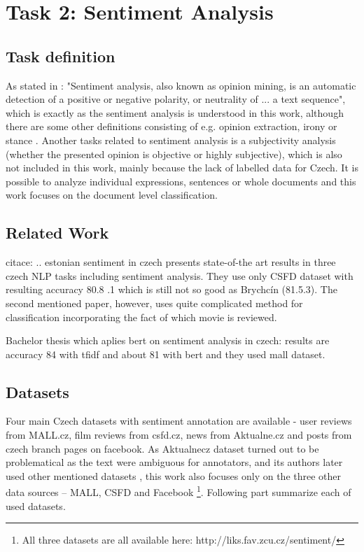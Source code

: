 \chapter{Task 2: Sentiment Analysis}
\label{chap:sent}
\section{Task definition}
As stated in \citep{Veselovska}: "Sentiment analysis, also known as opinion mining, is an automatic detection of a positive or negative polarity, or neutrality of ... a text sequence", which is exactly as the sentiment analysis is understood in this work, although there are some other definitions consisting of e.g. opinion extraction, irony or stance \citep{Montoyo2012}. Another tasks related to sentiment analysis is a subjectivity analysis (whether the presented opinion is objective or highly subjective), which is also not included in this work, mainly because the lack of labelled data for Czech. It is possible to analyze individual expressions, sentences or whole documents \citep{Veselovska} and this work focuses on the document level classification.

\section{Related Work}
citace:
\citep{Cano2019}
\citep{Kittask2020} .. estonian
\citep{Lenc2016} sentiment in czech
\citep{Hercig2018}
\citep{Li}
\citep{Libovicky} presents state-of-the art results in three czech NLP tasks including sentiment analysis. They use only CSFD dataset with resulting accuracy 80.8 .1 which is still not so good as Brychcín (81.5.3). The second mentioned paper, however, uses quite complicated method for classification incorporating the fact of which movie is reviewed. 

Bachelor thesis which aplies bert on sentiment analysis in czech:
results are accuracy 84 with tfidf and about 81 with bert and they used mall dataset.

\section{Datasets}
Four main Czech datasets with sentiment annotation are available - user reviews from MALL.cz, film reviews from csfd.cz, news from Aktualne.cz and posts from czech branch pages on facebook. As Aktualnecz dataset turned out to be problematical as the text were ambiguous for annotators, and its authors later used other mentioned datasets \citep{Veselovska}, this work also focuses only on the three other data sources -- MALL, CSFD and Facebook \footnote{All three datasets are all available here: http://liks.fav.zcu.cz/sentiment/}. Following part summarize each of used datasets.
